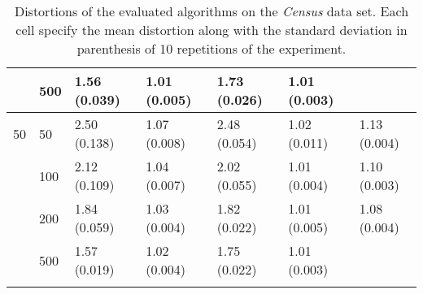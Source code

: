 \begin{longtable}{lllllll}
   & 500 &  1.56 (0.039) &   1.01 (0.005) &  1.73 (0.026) &         1.01 (0.003) &  \\
 \midrule
50 & 50  &  2.50 (0.138) &   1.07 (0.008) &  2.48 (0.054) &         1.02 (0.011) &  1.13 (0.004) \\
   & 100 &  2.12 (0.109) &   1.04 (0.007) &  2.02 (0.055) &         1.01 (0.004) &  1.10 (0.003) \\
   & 200 &  1.84 (0.059) &   1.03 (0.004) &  1.82 (0.022) &         1.01 (0.005) &  1.08 (0.004) \\
   & 500 &  1.57 (0.019) &   1.02 (0.004) &  1.75 (0.022) &         1.01 (0.003) &            \\
\bottomrule
\caption{Distortions of the evaluated algorithms on the \textit{Census} data set. Each cell specify the mean distortion along with the standard deviation in parenthesis of 10 repetitions of the experiment.}
\label{tab:distortions-mean-std-census}
\end{longtable}


